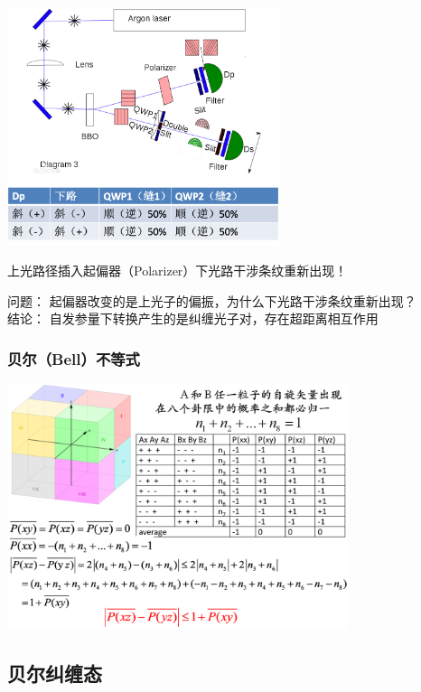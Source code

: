 \begin{frame}
    \frametitle{}
    \begin{center}
        \includegraphics[width=0.6\textwidth]{figs/c3.png}
    \end{center}
    上光路径插入起偏器（Polarizer）下光路干涉条纹重新出现！
\end{frame} 

\begin{frame}
    问题： 起偏器改变的是上光子的偏振，为什么下光路干涉条纹重新出现？\\ \vspace{0.8em}
    结论： 自发参量下转换产生的是纠缠光子对，存在超距离相互作用
\end{frame} 

\begin{frame}
    \frametitle{贝尔（Bell）不等式}
    \begin{center}
        \includegraphics[width=0.75\textwidth]{figs/29.png}
    \end{center}
\end{frame} 

\subsection{贝尔纠缠态}

